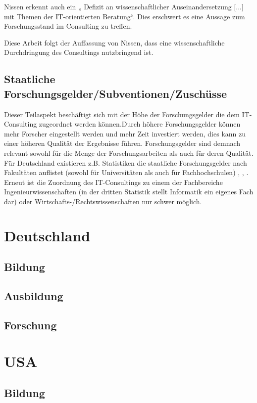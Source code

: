 Nissen erkennt auch ein „ Defizit an wissenschaftlicher Auseinandersetzung [...] mit Themen der IT-orientierten Beratung“. Dies erschwert es eine Aussage zum Forschungsstand im Consulting zu treffen.

Diese Arbeit folgt der Auffassung von Nissen, dass eine wissenschaftliche Durchdringung des Consultings nutzbringend ist.

\subsection{Staatliche Forschungsgelder/Subventionen/Zuschüsse}
Dieser Teilaspekt beschäftigt sich mit der Höhe der Forschungsgelder die dem IT-Consulting zugeordnet werden können.Durch höhere Forschungsgelder können mehr Forscher eingestellt werden und mehr Zeit investiert werden, dies kann zu einer höheren Qualität der Ergebnisse führen. Forschungsgelder sind demnach relevant sowohl für die Menge der Forschungsarbeiten als auch für deren Qualität.
Für Deutschland existieren z.B. Statistiken die staatliche Forschungsgelder nach Fakultäten auflistet (sowohl für Universitäten als auch für Fachhochschulen) \cite {ausgabenfakuni}, \cite {ausgabenfakfach}, \cite {ausgabenbmbf}. Erneut ist die Zuordnung des IT-Consultings zu einem der Fachbereiche Ingenieurwissenschaften (in der dritten Statistik stellt Informatik ein eigenes Fach dar) oder Wirtschafts-/Rechtswissenschaften nur schwer möglich.


\section{Deutschland}
\subsection{Bildung}
\subsection{Ausbildung}
\subsection{Forschung}

\section{USA}
\subsection{Bildung}
